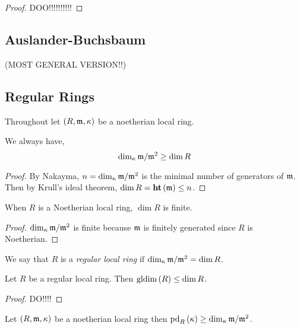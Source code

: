 \documentclass[12pt]{article}
\begin{document}
\begin{proof}
DOO!!!!!!!!!!
\end{proof}

\subsection{Auslander-Buchsbaum}

(MOST GENERAL VERSION!!)

\subsection{Regular Rings}

\begin{rmk}
Throughout let $(R, \mathfrak{m}, \kappa)$ be a noetherian local ring. 
\end{rmk}

\begin{lemma}
We always have,
\[ \dim_\kappa \mathfrak{m} / \mathfrak{m}^2 \ge \dim{R} \]
\end{lemma}

\begin{proof}
By Nakayma, $n = \dim_\kappa \mathfrak{m} / \mathfrak{m}^2$ is the minimal number of generators of $\mathfrak{m}$.   Then by Krull's ideal theorem, $\dim{R} = \mathbf{ht}\left( \mathfrak{m} \right) \le n$.
\end{proof}

\begin{cor}
When $R$ is a Noetherian local ring, $\dim{R}$ is finite.
\end{cor}

\begin{proof}
$\dim_\kappa \mathfrak{m} / \mathfrak{m}^2$ is finite because $\mathfrak{m}$ is finitely generated since $R$ is Noetherian.
\end{proof}

\begin{defn}
We say that $R$ is a \textit{regular local ring} if $\dim_\kappa \mathfrak{m} / \mathfrak{m}^2 = \dim{R}$.
\end{defn}

\begin{prop}
Let $R$ be a regular local ring. Then $\mathrm{gldim}\left( R \right) \le \dim{R}$.
\end{prop}

\begin{proof}
DO!!!!
\end{proof}

\begin{prop}
Let $(R, \mathfrak{m}, \kappa)$ be a noetherian local ring then $\mathrm{pd}_{R} \left( \kappa \right) \ge \dim_\kappa \mathfrak{m} / \mathfrak{m}^2$.
\end{prop}
\end{document}
